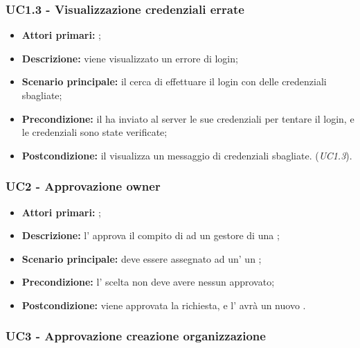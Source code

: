 \documentclass[../analisi-dei-requisiti]{subfiles}
\begin{document}
\subsubsection{UC1.3 - Visualizzazione credenziali errate}
\label{subsub:UC1.3}

\begin{itemize}
\item \textbf{Attori primari:} ;
\item \textbf{Descrizione:} viene visualizzato un errore di login;
\item \textbf{Scenario principale:} il  cerca di effettuare il login con delle credenziali sbagliate;
\item \textbf{Precondizione:} il  ha inviato al server le sue credenziali per tentare il login, e le credenziali sono state verificate;
\item \textbf{Postcondizione:} il  visualizza un messaggio di credenziali sbagliate. (\emph{UC1.3}).

\end{itemize}

\subsubsection{UC2 - Approvazione owner}
\label{subsub:UC2}

\begin{itemize}
\item \textbf{Attori primari:} ;
\item \textbf{Descrizione:} l' approva il compito di  ad un gestore di una ;
\item \textbf{Scenario principale:} deve essere assegnato ad un' un ;
\item \textbf{Precondizione:} l' scelta non deve avere nessun  approvato;
\item \textbf{Postcondizione:} viene approvata la richiesta, e l' avrà un nuovo .

\end{itemize}
\subsubsection{UC3 - Approvazione creazione organizzazione}
\label{subsub:UC3}
\end{document}
